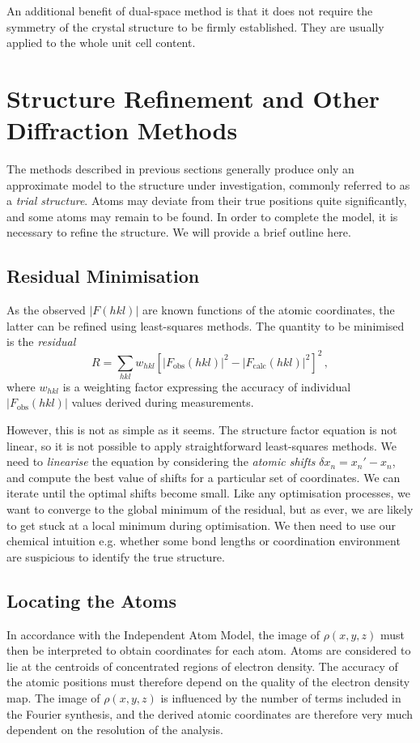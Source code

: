\documentclass{article}
\theoremstyle{plain}\theoremheaderfont{\normalfont\itshape}\theorembodyfont{\rmfamily}\theoremseparator{.}\newtheorem*{rem}{Remark}\newtheorem*{ex}{Example}\newtheorem*{proof}{Proof}\newtheorem*{altp}{Alternative proof}
\theoremstyle{plain}\theoremheaderfont{\normalfont\bfseries}\theorembodyfont{\rmfamily}\theoremseparator{.}\newtheorem{thm}{Theorem}[section]\newtheorem{lem}[thm]{Lemma}\newtheorem{prop}[thm]{Proposition}\newtheorem*{cor}{Corollary}\newtheorem{defn}[thm]{Definition}\newtheorem{clm}[thm]{Claim}\newtheorem{clminproof}{Claim}\newtheorem*{law}{Law}\newtheorem{pos}[thm]{Postulate}
\theoremstyle{break}\theoremheaderfont{\normalfont\itshape}\theorembodyfont{\rmfamily}\theoremseparator{.\medskip}\newtheorem*{proofskip}{Proof}\newtheorem*{exs}{Examples}\newtheorem*{rems}{Remarks}
\theoremstyle{break}\theoremheaderfont{\normalfont\bfseries}\theorembodyfont{\rmfamily}\theoremseparator{.\medskip}\newtheorem{lemskip}[thm]{Lemma}\newtheorem{defnskip}[thm]{Definition}\newtheorem{propskip}[thm]{Proposition}\newtheorem{thmskip}[thm]{Theorem}
\numberwithin{equation}{section}
\newcommand{\abs}[1]{\left| #1 \right|}
\begin{document}
    An additional benefit of dual-space method is that it does not require the symmetry of the crystal structure to be firmly established. They are usually applied to the whole unit cell content.

    \newpage
    \section{Structure Refinement and Other Diffraction Methods}
    The methods described in previous sections generally produce only an approximate model to the structure under investigation, commonly referred to as a \textit{trial structure}. Atoms may deviate from their true positions quite significantly, and some atoms may remain to be found. In order to complete the model, it is necessary to refine the structure. We will provide a brief outline here.

    \subsection{Residual Minimisation}
    As the observed \(\abs{F(hkl)}\) are known functions of the atomic coordinates, the latter can be refined using least-squares methods. The quantity to be minimised is the \textit{residual}
    \begin{equation}
        R=\sum_{hkl}w_{hkl}[\abs{F_{\text{obs}}(hkl)}^2-\abs{F_{\text{calc}}(hkl)}^2]^2\,,
    \end{equation}
    where \(w_{hkl}\) is a weighting factor expressing the accuracy of individual \(\abs{F_{\text{obs}}(hkl)}\) values derived during measurements.

    However, this is not as simple as it seems. The structure factor equation is not linear, so it is not possible to apply straightforward least-squares methods. We need to \textit{linearise} the equation by considering the \textit{atomic shifts} \(\delta x_n = x_n'-x_n\), and compute the best value of shifts for a particular set of coordinates. We can iterate until the optimal shifts become small. Like any optimisation processes, we want to converge to the global minimum of the residual, but as ever, we are likely to get stuck at a local minimum during optimisation. We then need to use our chemical intuition e.g. whether some bond lengths or coordination environment are suspicious to identify the true structure.

    \subsection{Locating the Atoms}
    In accordance with the Independent Atom Model, the image of \(\rho(x,y,z)\) must then be interpreted to obtain coordinates for each atom. Atoms are considered to lie at the centroids of concentrated regions of electron density. The accuracy of the atomic positions must therefore depend on the quality of the electron density map. The image of \(\rho(x,y,z)\) is influenced by the number of terms included in the Fourier synthesis, and the derived atomic coordinates are therefore very much dependent on the resolution of the analysis.
    
\end{document}
